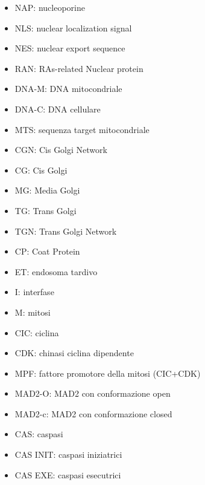 \begin{itemize}
    \item NAP: nucleoporine
    \item NLS: nuclear localization signal
    \item NES: nuclear export sequence
    \item RAN: RAs-related Nuclear protein
    \item DNA-M: DNA mitocondriale
    \item DNA-C: DNA cellulare
    \item MTS: sequenza target mitocondriale
    \item CGN: Cis Golgi Network
    \item CG: Cis Golgi
    \item MG: Media Golgi
    \item TG: Trans Golgi 
    \item TGN: Trans Golgi Network
    \item CP: Coat Protein
    \item ET: endosoma tardivo
    \item I: interfase
    \item M: mitosi
    \item CIC: ciclina
    \item CDK: chinasi ciclina dipendente
    \item MPF: fattore promotore della mitosi (CIC+CDK)
    \item MAD2-O: MAD2 con conformazione open
    \item MAD2-c: MAD2 con conformazione closed
    \item CAS: caspasi
    \item CAS INIT: caspasi iniziatrici
    \item CAS EXE: caspasi esecutrici
    
\end{itemize}

